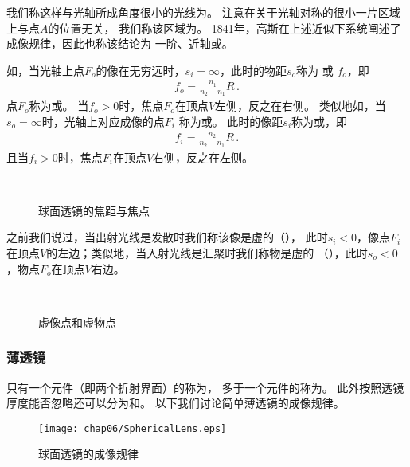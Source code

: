 我们称这样与光轴所成角度很小的光线为。
注意在关于光轴对称的很小一片区域上与点$A$的位置无关，
我们称该区域为。
1841年，高斯在上述近似下系统阐述了成像规律，因此也称该结论为
一阶、近轴或。

如，当光轴上点$F_o$的像在无穷远时，$s_i=\infty$，此时的物距$s_o$称为
或
$f_o$，即
\begin{align}
    f_o=\frac{n_1}{n_2-n_1}R\, .
\end{align}
点$F_o$称为或。
当$f_o>0$时，焦点$F_o$在顶点$V$左侧，反之在右侧。
类似地如，当$s_o=\infty$时，光轴上对应成像的点$F_i$
称为或。
此时的像距$s_i$称为或，即
\begin{align}
    f_i=\frac{n_2}{n_2-n_1}R\, .
\end{align}
且当$f_i>0$时，焦点$F_i$在顶点$V$右侧，反之在左侧。
\begin{figure}[htbp]
    \centering
    \,\,
    \caption{球面透镜的焦距与焦点}
    \label{fig:6.32}
\end{figure}

之前我们说过，当出射光线是发散时我们称该像是虚的（），
此时$s_i<0$，像点$F_i$在顶点$V$的左边；类似地，当入射光线是汇聚时我们称物是虚的
（），此时$s_o<0$，物点$F_o$在顶点$V$右边。
\begin{figure}[htbp]
    \centering
    \,\,\,
    \caption{虚像点和虚物点}
    \label{fig:6.33}
\end{figure}

\subsubsection{薄透镜}
只有一个元件（即两个折射界面）的称为，
多于一个元件的称为。
此外按照透镜厚度能否忽略还可以分为和。
以下我们讨论简单薄透镜的成像规律。
\begin{figure}[htbp]
    \centering\texttt{[image: chap06/SphericalLens.eps]}
    \caption{球面透镜的成像规律}
    \label{fig:6.34}
\end{figure}

